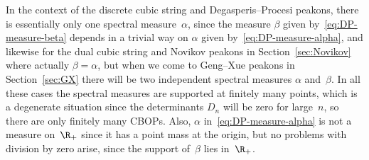 \documentclass[10pt,a4paper]{article} \pdfoutput=1 
\begin{document}
\begin{remark}
  \label{rem:DP-CBOP-discrete}
  In the context of the discrete cubic string and Degasperis--Procesi peakons,
  there is essentially only one spectral measure~$\alpha$,
  since the measure $\beta$ given by~\eqref{eq:DP-measure-beta}
  depends in a trivial way on $\alpha$ given by~\eqref{eq:DP-measure-alpha},
  and likewise for the dual cubic string and Novikov peakons in Section~\ref{sec:Novikov}
  where actually $\beta=\alpha$,
  but when we come to Geng--Xue peakons in Section~\ref{sec:GX}
  there will be two independent spectral measures $\alpha$ and~$\beta$.
  In all these cases the spectral measures are supported at finitely many points,
  which is a degenerate situation since the determinants $D_n$ will be zero for large~$n$,
  so there are only finitely many CBOPs.
  Also, $\alpha$ in~\eqref{eq:DP-measure-alpha} is not a measure on~$\R_+$ since it has a point mass
  at the origin, but no problems with division by zero arise, since the support of~$\beta$
  lies in~$\R_+$.
\end{remark}
\end{document}
